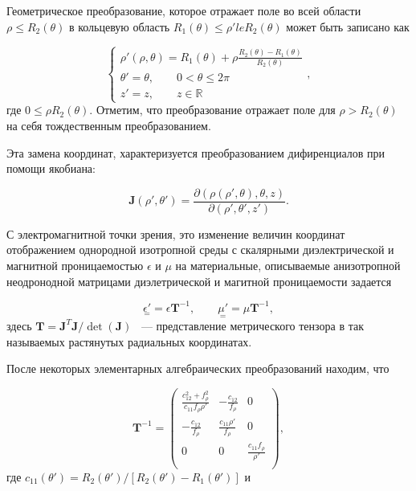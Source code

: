 \documentclass[a4paper, 12pt]{article}
\begin{document}
Геометрическое преобразование, которое отражает поле во всей области 
$\rho \le R_2(\theta)$ в кольцевую область $R_1(\theta) \le \rho' le R_2(\theta)$
может быть записано как

\begin{equation}
	\begin{cases}
\rho'(\rho, \theta) = R_1(\theta)+\rho \frac{R_2(\theta)-R_1(\theta)}{R_2(\theta)}\\
\theta'=\theta, \qquad 0 < \theta \le 2\pi\\
z'=z, \qquad z\in \mathbb{R}
	\end{cases},
\end{equation}
где $0 \le \rho R_2(\theta)$. Отметим, что преобразование отражает поле
для $\rho > R_2(\theta)$ на себя тождественным преобразованием.

Эта замена координат, характеризуется преобразованием дифиренциалов 
при помощи якобиана:

\begin{equation}
	\mathbf{J}(\rho',\theta') = 
	\frac{\partial (\rho(\rho',\theta), \theta, z)}{\partial(\rho',\theta',z')}.
\end{equation}

С электромагнитной точки зрения, это изменение величин координат 
отображением однородной изотропной среды с скалярными диэлектрической
и магнитной проницаемостью $\epsilon$ и $\mu$ на материальные, описываемые
анизотропной неодронодной матрицами диэлетрической и магитной проницаемости
задается \cite{8,14}

\begin{equation}
	\underset{=}{\epsilon'} = \epsilon \mathbf{T}^{-1}, \qquad
	\underset{=}{\mu'} = \mu \mathbf{T}^{-1},
\end{equation}
здесь $\mathbf{T}=\mathbf{J}^T\mathbf{J}/\det(\mathbf{J})$ ~--- представление 
метрического тензора в так называемых растянутых радиальных координатах.

После некоторых элементарных алгебраических преобразований находим, что

\begin{equation}
	\mathbf{T}^{-1} = 
	\begin{pmatrix}
\frac{c_{12}^2+f_\rho^2}{c_{11}f_\rho\rho'} & -\frac{c_{12}}{f_\rho} & 0 \\[10pt]
	-\frac{c_{12}}{f_\rho} &  \frac{c_{11}\rho'}{f_\rho} & 0 \\[10pt]
	0 & 0 & \frac{c_{11}f_\rho}{\rho'}\\[10pt]
	\end{pmatrix},
\end{equation}
где $c_{11}(\theta')=R_2(\theta')/[R_2(\theta')-R_1(\theta')]$ и
\end{document}
